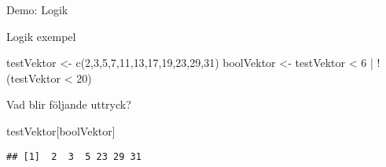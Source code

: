 \documentclass[
  10pt,
  ignorenonframetext,
]{beamer}
\newenvironment{Shaded}{\begin{snugshade}}{\end{snugshade}}
\newcommand{\DecValTok}[1]{\textcolor[rgb]{0.00,0.00,0.81}{#1}}
\newcommand{\FunctionTok}[1]{\textcolor[rgb]{0.00,0.00,0.00}{#1}}
\newcommand{\NormalTok}[1]{#1}
\newcommand{\OtherTok}[1]{\textcolor[rgb]{0.56,0.35,0.01}{#1}}
\newcommand{\SpecialCharTok}[1]{\textcolor[rgb]{0.00,0.00,0.00}{#1}}
\begin{document}

\begin{frame}{Demo: Logik}

\end{frame}



\begin{frame}[fragile]{Logik exempel}
\protect\hypertarget{logik-exempel}{}
\begin{Shaded}
\begin{Highlighting}[]
\NormalTok{testVektor }\OtherTok{\textless{}{-}} \FunctionTok{c}\NormalTok{(}\DecValTok{2}\NormalTok{,}\DecValTok{3}\NormalTok{,}\DecValTok{5}\NormalTok{,}\DecValTok{7}\NormalTok{,}\DecValTok{11}\NormalTok{,}\DecValTok{13}\NormalTok{,}\DecValTok{17}\NormalTok{,}\DecValTok{19}\NormalTok{,}\DecValTok{23}\NormalTok{,}\DecValTok{29}\NormalTok{,}\DecValTok{31}\NormalTok{)}
\NormalTok{boolVektor }\OtherTok{\textless{}{-}}\NormalTok{ testVektor }\SpecialCharTok{\textless{}} \DecValTok{6} \SpecialCharTok{|} \SpecialCharTok{!}\NormalTok{(testVektor }\SpecialCharTok{\textless{}} \DecValTok{20}\NormalTok{)}
\end{Highlighting}
\end{Shaded}

Vad blir följande uttryck?

\begin{Shaded}
\begin{Highlighting}[]
\NormalTok{testVektor[boolVektor]}
\end{Highlighting}
\end{Shaded}

\pause

\begin{verbatim}
## [1]  2  3  5 23 29 31
\end{verbatim}
\end{frame}
\end{document}
